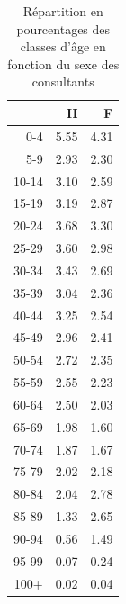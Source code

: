 \documentclass[12pt,english,french,twoside]{book}\usepackage[]{graphicx}\usepackage[]{color}
\begin{document}
\begin{table}[ht]
\centering
\begin{tabular}{rrr}
  \hline
 & H & F \\ 
  \hline
0-4 & 5.55 & 4.31 \\ 
  5-9 & 2.93 & 2.30 \\ 
  10-14 & 3.10 & 2.59 \\ 
  15-19 & 3.19 & 2.87 \\ 
  20-24 & 3.68 & 3.30 \\ 
  25-29 & 3.60 & 2.98 \\ 
  30-34 & 3.43 & 2.69 \\ 
  35-39 & 3.04 & 2.36 \\ 
  40-44 & 3.25 & 2.54 \\ 
  45-49 & 2.96 & 2.41 \\ 
  50-54 & 2.72 & 2.35 \\ 
  55-59 & 2.55 & 2.23 \\ 
  60-64 & 2.50 & 2.03 \\ 
  65-69 & 1.98 & 1.60 \\ 
  70-74 & 1.87 & 1.67 \\ 
  75-79 & 2.02 & 2.18 \\ 
  80-84 & 2.04 & 2.78 \\ 
  85-89 & 1.33 & 2.65 \\ 
  90-94 & 0.56 & 1.49 \\ 
  95-99 & 0.07 & 0.24 \\ 
  100+ & 0.02 & 0.04 \\ 
   \hline
\end{tabular}
\caption[Sexe et age en pourcentages]{Répartition en pourcentages des classes d'âge en fonction du sexe des consultants} 
\label{tab:pyr_p100}
\end{table}
\end{document}
